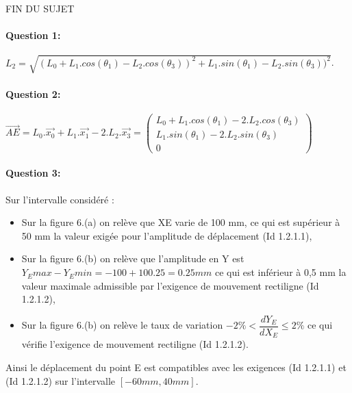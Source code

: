 \begin{center}
FIN DU SUJET
\end{center}

\newpage
\cleardoublepage

\ifdef{\public}{}{}

\ifdef{\public}{}{}


\newpage
\cleardoublepage

\pagestyle{correction}\setcounter{section}{0}

\paragraph{Question 1:} $L_2=\sqrt{(L_0+L_1.cos(\theta_1)-L_2.cos(\theta_3))^2+L_1.sin(\theta_1)-L_2.sin(\theta_3))^2}$.

\paragraph{Question 2:} $\overrightarrow{AE}=L_0.\overrightarrow{x_0}+L_1.\overrightarrow{x_1}-2.L_2.\overrightarrow{x_3}=\left(\begin{array}{c} L_0+L_1.cos(\theta_1)-2.L_2.cos(\theta_3) \\ L_1.sin(\theta_1)-2.L_2.sin(\theta_3) \\ 0
\end{array}\right)$

\paragraph{Question 3:} Sur l'intervalle considéré :
\begin{itemize}
 \item Sur la figure 6.(a) on relève que XE varie de 100 mm, ce qui est supérieur à 50 mm la valeur exigée pour l'amplitude de déplacement (Id 1.2.1.1),
 \item Sur la figure 6.(b) on relève que l'amplitude en Y est $Y_E{max}-Y_E{min}=-100+100.25=0.25mm$ ce qui est inférieur à 0,5 mm la valeur maximale admissible par l'exigence de mouvement rectiligne (Id 1.2.1.2),
 \item Sur la figure 6.(b) on relève le taux de variation $-2\%<\dfrac{dY_E}{dX_E} \leq 2\% $ ce qui vérifie l'exigence de mouvement rectiligne (Id 1.2.1.2).
\end{itemize}

Ainsi le déplacement du point E est compatibles avec les exigences (Id 1.2.1.1) et (Id 1.2.1.2) sur l'intervalle $[ -60 mm, 40 mm]$.

